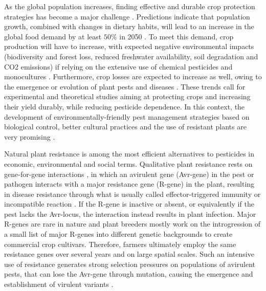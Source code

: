 {As the global population increases, finding effective and durable
crop protection strategies has become a major challenge \citep{Cunniffe2015}.
Predictions indicate that population growth, combined with changes in
dietary habits, will lead to an increase in the global food demand
by at least $50\%$ in 2050 \citep{Tilman2011,Springmann2016}. To meet
this demand, crop production will have to increase, with expected
negative environmental impacts (biodiversity and forest loss, reduced
freshwater availability, soil degradation and CO2 emissions) if relying
on the extensive use of chemical pesticides and monocultures \citep{Tilman2001,Stoate2009,Zhan2015}.
Furthermore, crop losses are expected to increase as well, owing to
the emergence or evolution of plant pests and diseases \citep{Palumbi2001,Stukenbrock2008}.
These trends call for experimental and theoretical studies aiming at
protecting crops and increasing their yield durably, while reducing
pesticide dependence. In this context, the development of
environmentally-friendly pest management strategies based on
biological control, better cultural practices and the use of resistant
plants are very promising \citep{Mundt2014,Zhan2015,vanLenteren2018}.

Natural plant resistance is among the most efficient alternatives
to pesticides in economic, environmental and social terms.
Qualitative plant resistance rests on gene-for-gene interactions \citep{Flor1971},
in which an avirulent gene (Avr-gene) in the pest or pathogen interacts
with a major resistance gene (R-gene) in the plant, resulting in disease
resistance through what is usually called effector-triggered immunity
or incompatible reaction \citep{Dangl2001,Jones2006}. If the R-gene
is inactive or absent, or equivalently if the pest lacks the Avr-locus,
the interaction instead results in plant infection. Major R-genes
are rare in nature and plant breeders mostly work on the introgression
of a small list of major R-genes into different genetic backgrounds
to create commercial crop cultivars. Therefore, farmers ultimately
employ the same resistance genes over several years and on large spatial
scales. Such an intensive use of resistance generates strong selection
pressures on populations of avirulent pests, that can lose the Avr-gene
through mutation, causing the emergence and establishment of virulent
variants \citep{Leonard1977,Castagnone-Sereno2002,McDonald2002,Parlevliet2002,Garcia-Arenal2003}.

}
